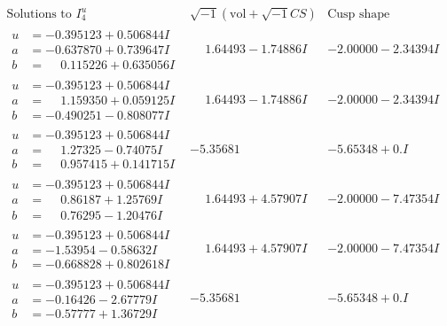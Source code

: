 \documentclass[1p]{elsarticle_modified}
\theoremstyle{definition}
\newcommand{\I}{\sqrt{-1}}
\begin{document}
$$\begin{array}{c|c|c}  
\text{Solutions to }I^u_{4}& \I (\text{vol} + \sqrt{-1}CS) & \text{Cusp shape}\\
 \hline 
\begin{aligned}
u &= -0.395123 + 0.506844 I \\
a &= -0.637870 + 0.739647 I \\
b &= \phantom{-}0.115226 + 0.635056 I\end{aligned}
 & \phantom{-}1.64493 - 1.74886 I & -2.00000 - 2.34394 I \\ \hline\begin{aligned}
u &= -0.395123 + 0.506844 I \\
a &= \phantom{-}1.159350 + 0.059125 I \\
b &= -0.490251 - 0.808077 I\end{aligned}
 & \phantom{-}1.64493 - 1.74886 I & -2.00000 - 2.34394 I \\ \hline\begin{aligned}
u &= -0.395123 + 0.506844 I \\
a &= \phantom{-}1.27325 - 0.74075 I \\
b &= \phantom{-}0.957415 + 0.141715 I\end{aligned}
 & -5.35681\phantom{ +0.000000I} & -5.65348 + 0. I\phantom{ +0.000000I} \\ \hline\begin{aligned}
u &= -0.395123 + 0.506844 I \\
a &= \phantom{-}0.86187 + 1.25769 I \\
b &= \phantom{-}0.76295 - 1.20476 I\end{aligned}
 & \phantom{-}1.64493 + 4.57907 I & -2.00000 - 7.47354 I \\ \hline\begin{aligned}
u &= -0.395123 + 0.506844 I \\
a &= -1.53954 - 0.58632 I \\
b &= -0.668828 + 0.802618 I\end{aligned}
 & \phantom{-}1.64493 + 4.57907 I & -2.00000 - 7.47354 I \\ \hline\begin{aligned}
u &= -0.395123 + 0.506844 I \\
a &= -0.16426 - 2.67779 I \\
b &= -0.57777 + 1.36729 I\end{aligned}
 & -5.35681\phantom{ +0.000000I} & -5.65348 + 0. I\phantom{ +0.000000I} \\ \hline\begin{aligned}

\end{aligned}
\end{array}$$
\end{document}
